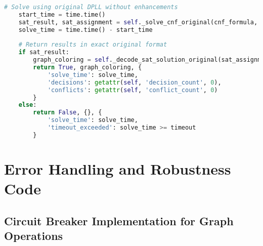\begin{lstlisting}[language=Python, caption=Interface Compatibility Preservation]
    # Solve using original DPLL without enhancements
    start_time = time.time()
    sat_result, sat_assignment = self._solve_cnf_original(cnf_formula, timeout)
    solve_time = time.time() - start_time
    
    # Return results in exact original format
    if sat_result:
        graph_coloring = self._decode_sat_solution_original(sat_assignment, vertices, num_colors)
        return True, graph_coloring, {
            'solve_time': solve_time,
            'decisions': getattr(self, 'decision_count', 0),
            'conflicts': getattr(self, 'conflict_count', 0)
        }
    else:
        return False, {}, {
            'solve_time': solve_time,
            'timeout_exceeded': solve_time >= timeout
        }
\end{lstlisting}

\section{Error Handling and Robustness Code}

\subsection{Circuit Breaker Implementation for Graph Operations}
\label{appendix:circuit-breaker}

